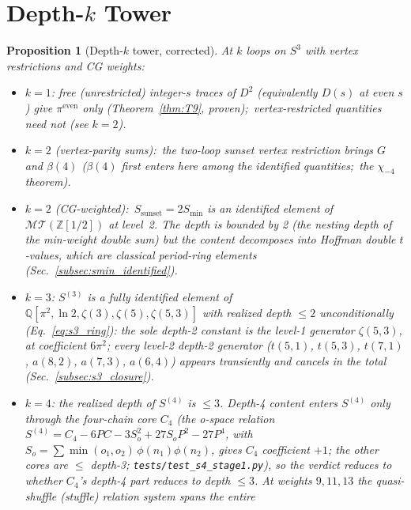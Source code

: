 \documentclass[11pt]{article}
\newtheorem{proposition}{Proposition}
\newcommand{\MT}{\mathcal{MT}}
\newcommand{\Z}{\mathbb{Z}}
\begin{document}
\section{Depth-$k$ Tower}
\label{sec:depth_k}

\begin{proposition}[Depth-$k$ tower, corrected]
\label{prop:depth_k}
At $k$ loops on $S^3$ with vertex restrictions and CG weights:
\begin{itemize}
\item $k = 1$: free (unrestricted) integer-$s$ traces of $D^2$
      (equivalently $D(s)$ at even $s$) give $\pi^{\mathrm{even}}$ only
      (Theorem~\ref{thm:T9}, proven);\ vertex-restricted quantities
      need not (see $k = 2$).
\item $k = 2$ (vertex-parity sums):\ the two-loop sunset vertex
      restriction brings $G$ and $\beta(4)$ ($\beta(4)$ first enters here among the identified quantities;\ the $\chi_{-4}$ theorem).
\item $k = 2$ (CG-weighted):\ $S_{\mathrm{sunset}} = 2S_{\min}$ is an identified element of $\MT(\Z[1/2])$
      at level~2.  The depth is \emph{bounded} by 2 (the nesting depth
      of the min-weight double sum) but the content decomposes into
      Hoffman double $t$-values, which are classical period-ring
      elements (Sec.~\ref{subsec:smin_identified}).
\item $k = 3$: $S^{(3)}$ is a fully identified element of
      $\mathbb{Q}[\pi^2, \ln 2, \zeta(3), \zeta(5), \zeta(5,3)]$ with
      \emph{realized} depth $\le 2$ unconditionally
      (Eq.~\eqref{eq:s3_ring}): the sole depth-2 constant is the
      level-1 generator $\zeta(5,3)$, at coefficient $6\pi^2$; every
      level-2 depth-2 generator ($t(5,1)$, $t(5,3)$, $t(7,1)$,
      $a(8,2)$, $a(7,3)$, $a(6,4)$) appears transiently and cancels in
      the total (Sec.~\ref{subsec:s3_closure}).
\item $k = 4$: the \emph{realized} depth of $S^{(4)}$ is $\le 3$.
      Depth-4 content enters $S^{(4)}$ only through the four-chain core
      $C_4$ (the o-space relation
      $S^{(4)} = C_4 - 6PC - 3S_o^2 + 27S_oP^2 - 27P^4$, with
      $S_o = \sum \min(o_1,o_2)\,\phi(n_1)\phi(n_2)$, gives $C_4$
      coefficient $+1$; the other cores are $\le$ depth-3;
      \texttt{tests/test\_s4\_stage1.py}), so the verdict reduces to whether $C_4$'s
      depth-4 part reduces to depth $\le 3$. At weights $9, 11, 13$ the
      quasi-shuffle (stuffle) relation system spans the \emph{entire}

\end{itemize}
\end{proposition}
\end{document}
